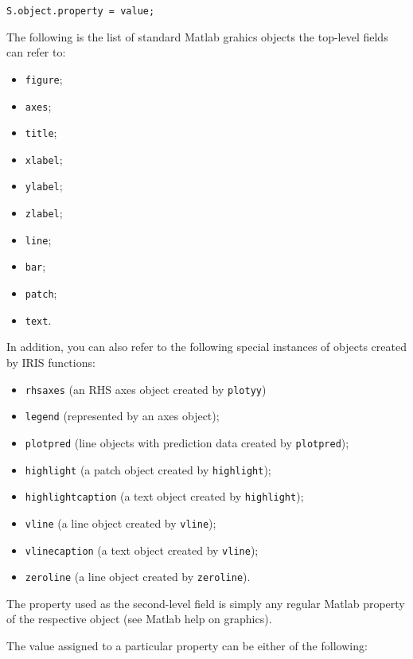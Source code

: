 \begin{verbatim}
S.object.property = value;
\end{verbatim}

The following is the list of standard Matlab grahics objects the
top-level fields can refer to:

\begin{itemize}
\itemsep1pt\parskip0pt
\item
  \texttt{figure};
\item
  \texttt{axes};
\item
  \texttt{title};
\item
  \texttt{xlabel};
\item
  \texttt{ylabel};
\item
  \texttt{zlabel};
\item
  \texttt{line};
\item
  \texttt{bar};
\item
  \texttt{patch};
\item
  \texttt{text}.
\end{itemize}

In addition, you can also refer to the following special instances of
objects created by IRIS functions:

\begin{itemize}
\itemsep1pt\parskip0pt
\item
  \texttt{rhsaxes} (an RHS axes object created by \texttt{plotyy})
\item
  \texttt{legend} (represented by an axes object);
\item
  \texttt{plotpred} (line objects with prediction data created by
  \texttt{plotpred});
\item
  \texttt{highlight} (a patch object created by \texttt{highlight});
\item
  \texttt{highlightcaption} (a text object created by
  \texttt{highlight});
\item
  \texttt{vline} (a line object created by \texttt{vline});
\item
  \texttt{vlinecaption} (a text object created by \texttt{vline});
\item
  \texttt{zeroline} (a line object created by \texttt{zeroline}).
\end{itemize}

The property used as the second-level field is simply any regular Matlab
property of the respective object (see Matlab help on graphics).

The value assigned to a particular property can be either of the
following:

